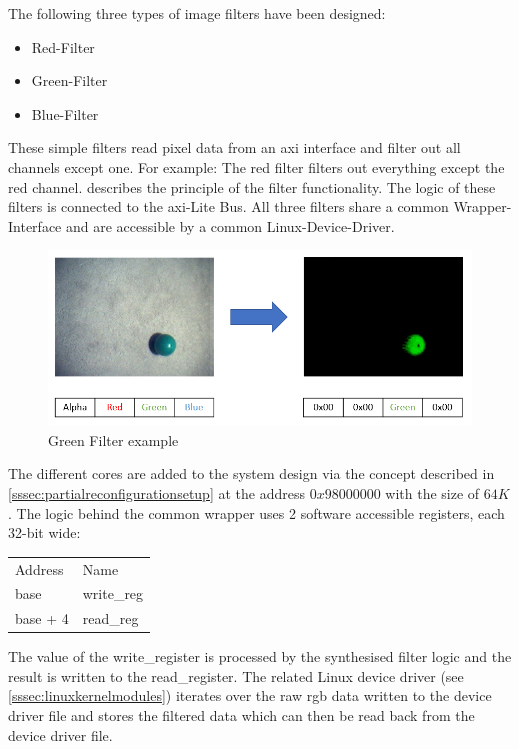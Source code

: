 The following three types of image filters have been designed:
\begin{itemize}
    \item Red-Filter
    \item Green-Filter
    \item Blue-Filter
\end{itemize}

These simple filters read pixel data from an \gls{axi} interface and filter out
all channels except one. For example: The red filter filters out everything except the red channel.
 describes the principle of the filter functionality.
The logic of these filters is connected to the \gls{axi}-Lite Bus.
All three filters share a common Wrapper-Interface and are accessible by a
common Linux-Device-Driver.

\begin{figure}[htbp]
    \centering
    \includegraphics[width=1\textwidth]{images/ImageFilter.PNG}
    \caption{\label{fig:imagefilter} Green Filter example}
\end{figure}

The different cores are added to the system design via the concept described in
\cref{sssec:partialreconfigurationsetup} at the address $0x98000000$ with
the size of $64K$.
The logic behind the common wrapper uses 2 software accessible registers, each
32-bit wide:

\begin{tabular}{ll}
	Address & Name \\
	base     & write\_reg\\
	base + 4 & read\_reg\\
\end{tabular}
\medbreak

The value of the write\_register is processed by the synthesised filter logic
and the result is written to the read\_register.
The related Linux device driver (see \cref{sssec:linuxkernelmodules}) iterates over
the raw \gls{rgb} data written to the device driver file and stores the filtered
data which can then be read back from the device driver file.
